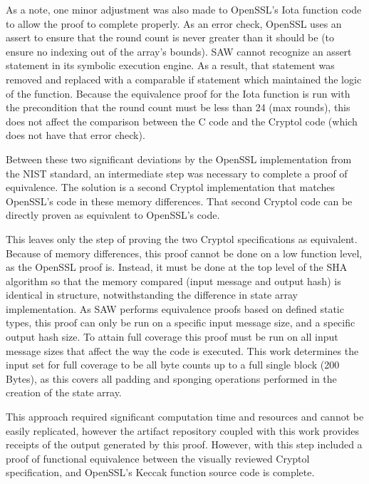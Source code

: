 As a note, one minor adjustment was also made to OpenSSL's Iota function code to allow the proof to complete properly.
As an error check, OpenSSL uses an assert to ensure that the round count is never greater than it should be (to ensure no indexing out of the array's bounds).
SAW cannot recognize an assert statement in its symbolic execution engine.
As a result, that statement was removed and replaced with a comparable if statement which maintained the logic of the function.
Because the equivalence proof for the Iota function is run with the precondition that the round count must be less than 24 (max rounds), this does not affect the comparison between the C code and the Cryptol code (which does not have that error check).




Between these two significant deviations by the OpenSSL implementation from the NIST standard, an intermediate step was necessary to complete a proof of equivalence.
The solution is a second Cryptol implementation that matches OpenSSL's code in these memory differences.
That second Cryptol code can be directly proven as equivalent to OpenSSL's code.

This leaves only the step of proving the two Cryptol specifications as equivalent.
Because of memory differences, this proof cannot be done on a low function level, as the OpenSSL proof is.
Instead, it must be done at the top level of the SHA algorithm so that the memory compared (input message and output hash) is identical in structure, notwithstanding the difference in state array implementation.
As SAW performs equivalence proofs based on defined static types, this proof can only be run on a specific input message size, and a specific output hash size.
To attain full coverage this proof must be run on all input message sizes that affect the way the code is executed.
This work determines the input set for full coverage to be all byte counts up to a full single block (200 Bytes), as this covers all padding and sponging operations performed in the creation of the state array.

This approach required significant computation time and resources and cannot be easily replicated, however the artifact repository coupled with this work provides receipts of the output generated by this proof.
However, with this step included a proof of functional equivalence between the visually reviewed Cryptol specification, and OpenSSL's Keccak function source code is complete.